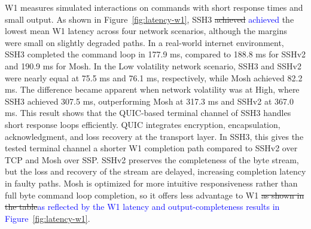 W1 measures simulated interactions on commands with short response times and small output. As shown in Figure~\ref{fig:latency-w1}, SSH3 \sout{achieved} \textcolor{blue}{achieved} the lowest mean W1 latency across four network scenarios, although the margins were small on slightly degraded paths. In a real-world internet environment, SSH3 completed the command loop in 177.9 ms, compared to 188.8 ms for SSHv2 and 190.9 ms for Mosh. In the Low volatility network scenario, SSH3 and SSHv2 were nearly equal at 75.5 ms and 76.1 ms, respectively, while Mosh achieved 82.2 ms. The difference became apparent when network volatility was at High, where SSH3 achieved 307.5 ms, outperforming Mosh at 317.3 ms and SSHv2 at 367.0 ms. This result shows that the QUIC-based terminal channel of SSH3 handles short response loops efficiently. QUIC integrates encryption, encapsulation, acknowledgment, and loss recovery at the transport layer. In SSH3, this gives the tested terminal channel a shorter W1 completion path compared to SSHv2 over TCP and Mosh over SSP. SSHv2 preserves the completeness of the byte stream, but the loss and recovery of the stream are delayed, increasing completion latency in faulty paths. Mosh is optimized for more intuitive responsiveness rather than full byte command loop completion, so it offers less advantage to W1 \sout{as shown in the table}\textcolor{blue}{as reflected by the W1 latency and output-completeness results in Figure~\ref{fig:latency-w1}}.

